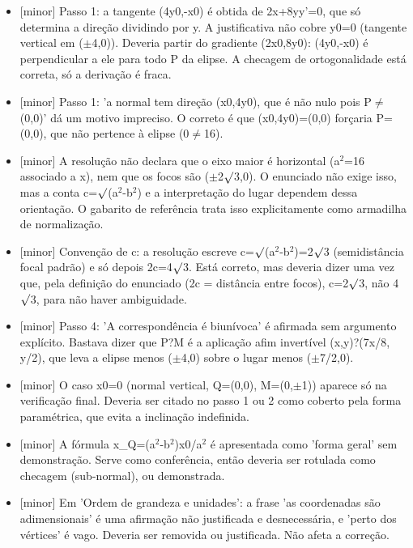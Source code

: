 \documentclass{article}%
\begin{document}
\begin{itemize}%
\item%
{[}minor{]} Passo 1: a tangente (4y0,-x0) é obtida de 2x+8yy'=0, que só determina a direção dividindo por y. A justificativa não cobre y0=0 (tangente vertical em ($\pm$4,0)). Deveria partir do gradiente (2x0,8y0): (4y0,-x0) é perpendicular a ele para todo P da elipse. A checagem de ortogonalidade está correta, só a derivação é fraca.%
\item%
{[}minor{]} Passo 1: 'a normal tem direção (x0,4y0), que é não nulo pois P$\neq$(0,0)' dá um motivo impreciso. O correto é que (x0,4y0)=(0,0) forçaria P=(0,0), que não pertence à elipse (0$\neq$16).%
\item%
{[}minor{]} A resolução não declara que o eixo maior é horizontal (a$^2$=16 associado a x), nem que os focos são ($\pm$2$\surd$3,0). O enunciado não exige isso, mas a conta c=$\surd$(a$^2$-b$^2$) e a interpretação do lugar dependem dessa orientação. O gabarito de referência trata isso explicitamente como armadilha de normalização.%
\item%
{[}minor{]} Convenção de c: a resolução escreve c=$\surd$(a$^2$-b$^2$)=2$\surd$3 (semidistância focal padrão) e só depois 2c=4$\surd$3. Está correto, mas deveria dizer uma vez que, pela definição do enunciado (2c = distância entre focos), c=2$\surd$3, não 4$\surd$3, para não haver ambiguidade.%
\item%
{[}minor{]} Passo 4: 'A correspondência é biunívoca' é afirmada sem argumento explícito. Bastava dizer que P?M é a aplicação afim invertível (x,y)?(7x/8, y/2), que leva a elipse menos ($\pm$4,0) sobre o lugar menos ($\pm$7/2,0).%
\item%
{[}minor{]} O caso x0=0 (normal vertical, Q=(0,0), M=(0,$\pm$1)) aparece só na verificação final. Deveria ser citado no passo 1 ou 2 como coberto pela forma paramétrica, que evita a inclinação indefinida.%
\item%
{[}minor{]} A fórmula x\_Q=(a$^2$-b$^2$)x0/a$^2$ é apresentada como 'forma geral' sem demonstração. Serve como conferência, então deveria ser rotulada como checagem (sub{-}normal), ou demonstrada.%
\item%
{[}minor{]} Em 'Ordem de grandeza e unidades': a frase 'as coordenadas são adimensionais' é uma afirmação não justificada e desnecessária, e 'perto dos vértices' é vago. Deveria ser removida ou justificada. Não afeta a correção.%
\end{itemize}%
\end{document}

